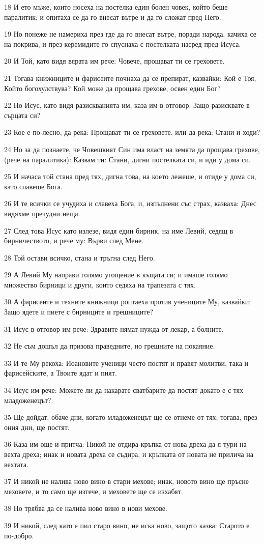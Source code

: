 \par 18 И ето мъже, които носеха на постелка един болен човек, който беше паралитик; и опитаха се да го внесат вътре и да го сложат пред Него.
\par 19 Но понеже не намериха през где да го внесат вътре, поради народа, качиха се на покрива, и през керемидите го спуснаха с постелката насред пред Исуса.
\par 20 И Той, като видя вярата им рече: Човече, прощават ти се греховете.
\par 21 Тогава книжниците и фарисеите почнаха да се препират, казвайки: Кой е Тоя, Който богохулствува? Кой може да прощава грехове, освен един Бог?
\par 22 Но Исус, като видя разискванията им, каза им в отговор: Защо разисквате в сърцата си?
\par 23 Кое е по-лесно, да река: Прощават ти се греховете, или да река: Стани и ходи?
\par 24 Но за да познаете, че Човешкият Син има власт на земята да прощава грехове, (рече на паралитика): Казвам ти: Стани, дигни постелката си, и иди у дома си.
\par 25 И начаса той стана пред тях, дигна това, на което лежеше, и отиде у дома си, като славеше Бога.
\par 26 И те всички се учудиха и славеха Бога, и, изпълнени със страх, казваха: Днес видяхме пречудни неща.
\par 27 След това Исус като излезе, видя един бирник, на име Левий, седящ в бирничеството, и рече му: Върви след Мене.
\par 28 Той остави всичко, стана и тръгна след Него.
\par 29 А Левий Му направи голямо угощение в къщата си; и имаше голямо множество бирници и други, които седяха на трапезата с тях.
\par 30 А фарисеите и техните книжници роптаеха против учениците Му, казвайки: Защо ядете и пиете с бирниците и грешниците?
\par 31 Исус в отговор им рече: Здравите нямат нужда от лекар, а болните.
\par 32 Не съм дошъл да призова праведните, но грешните на покаяние.
\par 33 И те Му рекоха: Иоановите ученици често постят и правят молитви, така и фарисейските, а Твоите ядат и пият.
\par 34 Исус им рече: Можете ли да накарате сватбарите да постят докато е с тях младоженецът?
\par 35 Ще дойдат, обаче дни, когато младоженецът ще се отнеме от тях; тогава, през ония дни, ще постят.
\par 36 Каза им още и притча: Никой не отдира кръпка от нова дреха да я тури на вехта дреха; инак и новата дреха се съдира, и кръпката от новата не прилича на вехтата.
\par 37 И никой не налива ново вино в стари мехове; инак, новото вино ще пръсне меховете, и то само ще изтече, и меховете ще се изхабят.
\par 38 Но трябва да се налива ново вино в нови мехове.
\par 39 И никой, след като е пил старо вино, не иска ново, защото казва: Старото е по-добро.

